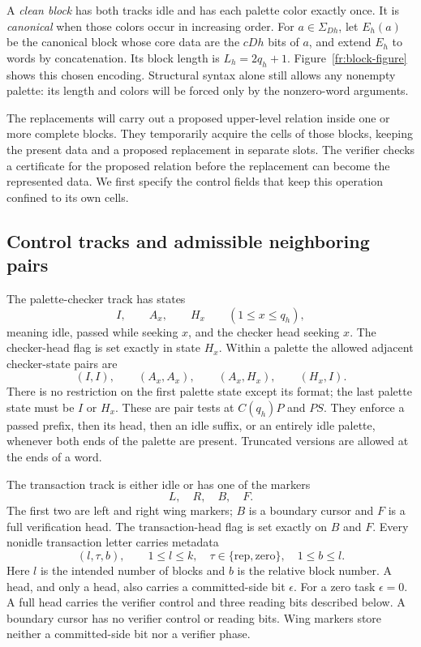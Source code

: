 A \emph{clean block} has both tracks idle and has each palette color
exactly once. It is \emph{canonical} when those colors occur in increasing
order. For $a\in\Sigma_{Dh}$, let $E_h(a)$ be the canonical block whose
core data are the $cDh$ bits of $a$, and extend $E_h$ to words by
concatenation. Its block length is $L_h=2q_h+1$.
Figure~\ref{fr:block-figure} shows this chosen encoding. Structural
syntax alone still allows any nonempty palette: its length and colors
will be forced only by the nonzero-word arguments.


The replacements will carry out a proposed upper-level relation inside
one or more complete blocks. They temporarily acquire the cells of those
blocks, keeping the present data and a proposed replacement in separate
slots. The verifier checks a certificate for the proposed relation before
the replacement can become the represented data. We first specify the
control fields that keep this operation confined to its own cells.

\subsection{Control tracks and admissible neighboring pairs}

The palette-checker track has states
\[
 I,\qquad A_x,\qquad H_x\qquad(1\leq x\leq q_h),
\]
meaning idle, passed while seeking $x$, and the checker head seeking
$x$. The checker-head flag is set exactly in state $H_x$.
Within a palette the allowed adjacent checker-state pairs are
\[
 (I,I),\qquad (A_x,A_x),\qquad (A_x,H_x),
 \qquad (H_x,I).
\label{fr:checker-pairs}
\]
There is no restriction on the first palette state except its format;
the last palette state must be $I$ or $H_x$.  These are pair tests at
$C(q_h)P$ and $PS$.  They enforce a passed prefix, then its head, then
an idle suffix, or an entirely idle palette, whenever both ends of
the palette are present.  Truncated versions are allowed at the ends
of a word.

The transaction track is either idle or has one of the markers
\[
 L,\quad R,\quad B,\quad F.
\]
The first two are left and right wing markers; $B$ is a boundary
cursor and $F$ is a full verification head. The transaction-head flag
is set exactly on $B$ and $F$. Every nonidle transaction
letter carries metadata
\[
 (l,\tau,b),\qquad 1\leq l\leq k,\quad
 \tau\in\{\mathrm{rep},\mathrm{zero}\},\quad 1\leq b\leq l.
\]
Here $l$ is the intended number of blocks and $b$ is the relative
block number.  A head, and only a head, also carries a committed-side
bit $\epsilon$.  For a zero task $\epsilon=0$.  A full head carries
the verifier control and three reading bits described below.  A
boundary cursor has no verifier control or reading bits.  Wing
markers store neither a committed-side bit nor a verifier phase.

